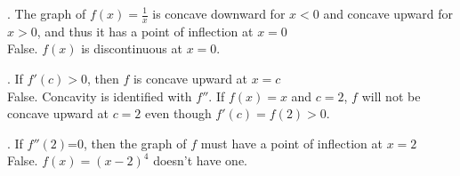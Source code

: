 \documentclass[11pt]{article}
\newcommand*{\next}{\noindent}
\begin{document}
\newpage \next
92. The graph of $f(x)=\frac{1}{x}$ is concave downward for $x<0$ and concave upward for $x>0$, and thus it has a point of inflection at $x=0$\\
\indent False. $f(x)$ is discontinuous at $x=0$.

\vspace{0.75cm}
\next
93. If $f'(c)>0$, then $f$ is concave upward at $x=c$\\
\indent False. Concavity is identified with $f''$. If $f(x)=x$ and $c=2$, $f$ will not be concave upward at $c=2$ even though $f'(c)=f(2)>0$.

\vspace{0.75cm}
\next
94. If $f''(2)$=0, then the graph of $f$ must have a point of inflection at $x=2$\\
\indent False. $f(x)=(x-2)^4$ doesn't have one.
\end{document}
